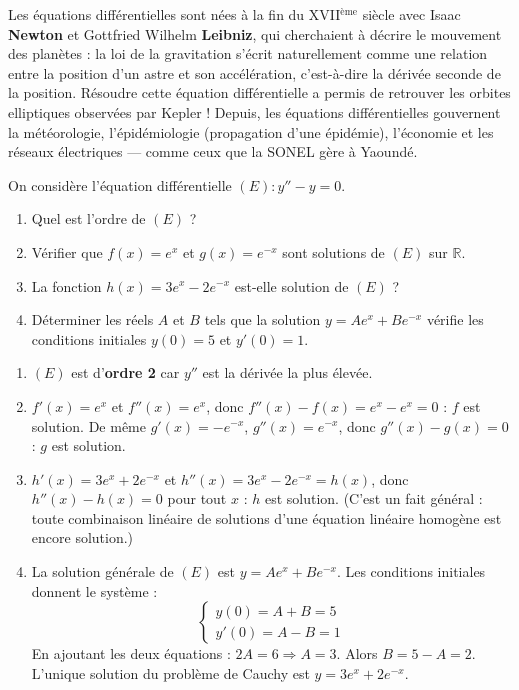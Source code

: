 \documentclass[11pt]{article}
\begin{document}
\begin{savaistu}
Les équations différentielles sont nées à la fin du XVII$^{\text{ème}}$ siècle avec Isaac \textbf{Newton} et Gottfried Wilhelm \textbf{Leibniz}, qui cherchaient à décrire le mouvement des planètes : la loi de la gravitation s'écrit naturellement comme une relation entre la position d'un astre et son accélération, c'est-à-dire la dérivée seconde de la position. Résoudre cette équation différentielle a permis de retrouver les orbites elliptiques observées par Kepler ! Depuis, les équations différentielles gouvernent la météorologie, l'épidémiologie (propagation d'une épidémie), l'économie et les réseaux électriques — comme ceux que la SONEL gère à Yaoundé.
\end{savaistu}

\begin{exercice}
On considère l'équation différentielle $(E) : y'' - y = 0$.
\begin{enumerate}
\item Quel est l'ordre de $(E)$ ?
\item Vérifier que $f(x) = e^x$ et $g(x) = e^{-x}$ sont solutions de $(E)$ sur $\mathbb{R}$.
\item La fonction $h(x) = 3e^x - 2e^{-x}$ est-elle solution de $(E)$ ?
\item Déterminer les réels $A$ et $B$ tels que la solution $y = Ae^x + Be^{-x}$ vérifie les conditions initiales $y(0) = 5$ et $y'(0) = 1$.
\end{enumerate}
\end{exercice}

\begin{corrige}[Exercice 1]
\begin{enumerate}
\item $(E)$ est d'\textbf{ordre 2} car $y''$ est la dérivée la plus élevée.
\item $f'(x) = e^x$ et $f''(x) = e^x$, donc $f''(x) - f(x) = e^x - e^x = 0$ : $f$ est solution. De même $g'(x) = -e^{-x}$, $g''(x) = e^{-x}$, donc $g''(x) - g(x) = 0$ : $g$ est solution.
\item $h'(x) = 3e^x + 2e^{-x}$ et $h''(x) = 3e^x - 2e^{-x} = h(x)$, donc $h''(x) - h(x) = 0$ pour tout $x$ : $h$ est solution. (C'est un fait général : toute combinaison linéaire de solutions d'une équation linéaire homogène est encore solution.)
\item La solution générale de $(E)$ est $y = Ae^x + Be^{-x}$.
      Les conditions initiales donnent le système :
      \[ \begin{cases} y(0) = A + B = 5 \\ y'(0) = A - B = 1 \end{cases} \]
      En ajoutant les deux équations : $2A = 6 \Rightarrow A = 3$.
      Alors $B = 5 - A = 2$.
      L'unique solution du problème de Cauchy est $y = 3e^x + 2e^{-x}$.
\end{enumerate}
\end{corrige}
\end{document}

